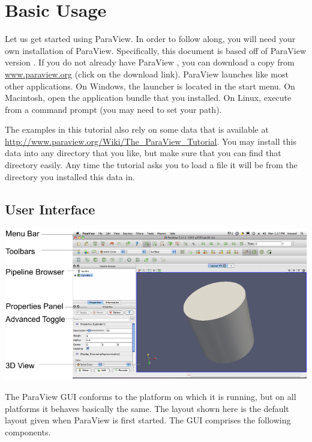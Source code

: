 \chapter{Basic Usage}
\label{chap:BasicUsage}

Let us get started using ParaView.  In order to follow along, you will need
your own installation of ParaView.  Specifically, this document is based
off of ParaView version \pvversion.  If you do not already have ParaView
\pvversion, you can download a copy from
\href{http://www.paraview.org}{www.paraview.org} (click on the download
link).  ParaView launches like most other applications.  On Windows, the
launcher is located in the start menu.  On Macintosh, open the application
bundle that you installed.  On Linux, execute  from a
command prompt (you may need to set your path).

The examples in this tutorial also rely on some data that is available at
\href{http://www.paraview.org/Wiki/The_ParaView_Tutorial}{http://www.paraview.org/Wiki/The\_ParaView\_Tutorial}.
You may install this data into any directory that you like, but make sure
that you can find that directory easily.  Any time the tutorial asks you to
load a file it will be from the directory you installed this data in.


\section{User Interface}

\begin{inlinefig}
  \includegraphics[scale=\bbscale]{images/UserInterface}
\end{inlinefig}

The ParaView GUI conforms to the platform on which it is running, but on
all platforms it behaves basically the same.  The layout shown here is the
default layout given when ParaView is first started.  The GUI comprises the
following components.

